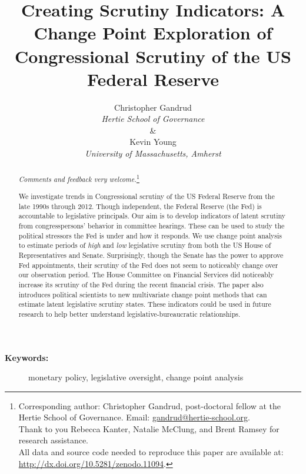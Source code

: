 \documentclass[a4paper]{article}\usepackage[]{graphicx}\usepackage[]{color}
\title{Creating Scrutiny Indicators: A Change Point Exploration of Congressional Scrutiny of the US Federal Reserve}
\author{Christopher Gandrud \\ {\emph{Hertie School of Governance}} \\ \& \\ Kevin Young \\ {\emph{University of Massachusetts, Amherst}}}
\begin{document}
\maketitle

\begin{abstract}

\noindent\emph{Comments and feedback very welcome.}\footnote{Corresponding author: Christopher Gandrud, post-doctoral fellow at the Hertie School of Governance. Email: \href{mailto:gandrud@hertie-school.org}{gandrud@hertie-school.org}. \\ Thank to you Rebecca Kanter, Natalie McClung, and Brent Ramsey for research assistance. \\
All data and source code needed to reproduce this paper are available at: \url{http://dx.doi.org/10.5281/zenodo.11094}.}

We investigate trends in Congressional scrutiny of the US Federal Reserve from the late 1990s through 2012. Though independent, the Federal Reserve (the Fed) is accountable to legislative principals. Our aim is to develop indicators of latent scrutiny from congresspersons' behavior in committee hearings. These can be used to study the political stressors the Fed is under and how it responds. We use change point analysis to estimate periods of \emph{high} and \emph{low} legislative scrutiny from both the US House of Representatives and Senate. Surprisingly, though the Senate has the power to approve Fed appointments, their scrutiny of the Fed does not seem to noticeably change over our observation period. The House Committee on Financial Services did noticeably increase its scrutiny of the Fed during the recent financial crisis. The paper also introduces political scientists to new multivariate change point methods that can estimate latent legislative scrutiny states. These indicators could be used in future research to help better understand legislative-bureaucratic relationships.

\end{abstract}

\begin{description}
  \item [{\textbf{Keywords:}}] monetary policy, legislative oversight, change point analysis
\end{description}
\end{document}

